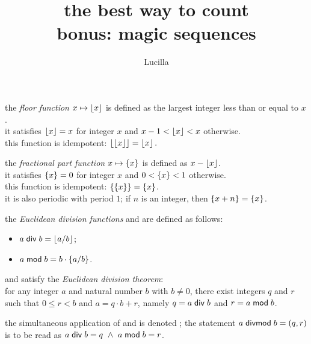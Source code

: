 \documentclass[a4paper, 12pt]{report}
\title{the best way to count \\ \Large bonus: magic sequences}
\author{Lucilla}
\date{}
\begin{document}
\vfill \maketitle \vfill \newpage

\begin{definition}
	the \emph{floor function} $x \mapsto \left\lfloor x \right\rfloor$ is defined as the largest integer less than or equal to $x$. \\ it satisfies $\left\lfloor x \right\rfloor = x$ for integer $x$ and $x - 1 < \left\lfloor x \right\rfloor < x$ otherwise. \\ this function is idempotent: $\left\lfloor \left\lfloor x \right\rfloor \right\rfloor = \left\lfloor x \right\rfloor.$ \bigskip

	the \emph{fractional part function} $x \mapsto \left\{ x \right\}$ is defined as $x - \left\lfloor x \right\rfloor$. \\ it satisfies $\left\{ x \right\} = 0$ for integer $x$ and $0 < \left\{ x \right\} < 1$ otherwise. \\ this function is idempotent: $\left\{ \left\{ x \right\} \right\} = \left\{ x \right\}$. \\ it is also periodic with period $1$; if $n$ is an integer, then $\left\{ x + n \right\} = \left\{ x \right\}$.
\end{definition} \bigskip

\begin{definition}
	the \emph{Euclidean division functions} \tdiv{} and \tmod{} are defined as follows:

	\begin{itemize}
		\item $a \;\mathsf{div}\; b = \left\lfloor a / b \right\rfloor$;
		\item $a \;\mathsf{mod}\; b = b \cdot \left\{ a / b \right\}$.
	\end{itemize}

	\tdiv{} and \tmod{} satisfy the \emph{Euclidean division theorem}: \\ for any integer $a$ and natural number $b$ with $b \neq 0$, there exist integers $q$ and $r$ such that $0 \leq r < b$ and $a = q \cdot b + r$, namely $q = a \;\mathsf{div}\; b$ and $r = a \;\mathsf{mod}\; b$. \medskip

	the simultaneous application of \tdiv{} and \tmod{} is denoted \tdivmod; the statement $a \;\mathsf{divmod}\; b = (q, r)$ is to be read as $a \;\mathsf{div}\; b = q \ \wedge \ a \;\mathsf{mod}\; b = r$.
\end{definition} \bigskip
\end{document}
